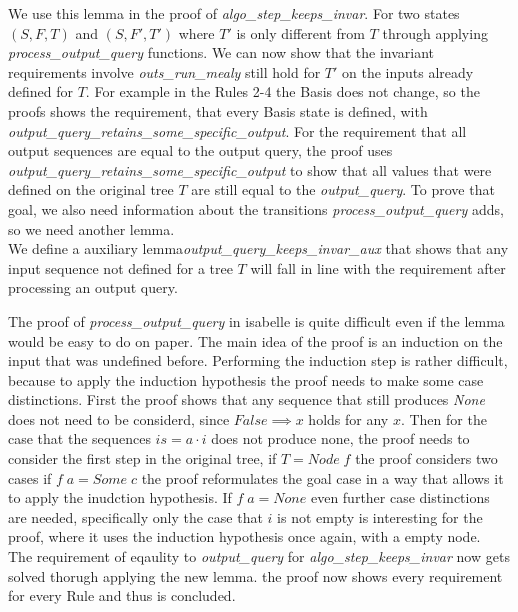  We use this lemma in the proof of \textit{algo\_step\_keeps\_invar}. For two states $(S,F,T)$ and $(S,F',T')$ where $T'$ is only different from $T$ through applying \textit{process\_output\_query} functions. We can now show that the invariant requirements involve \textit{outs\_run\_mealy} still hold for $T'$ on the inputs already defined for $T$. For example in the Rules 2-4 the Basis does not change, so the proofs shows the requirement, that every Basis state is defined, with \textit{output\_query\_retains\_some\_specific\_output}. For the requirement that all output sequences are equal to the output query, the proof uses \textit{output\_query\_retains\_some\_specific\_output} to show that all values that were defined on the original tree $T$ are still equal to the \textit{output\_query}. To prove that goal, we also need information about the transitions \textit{process\_output\_query} adds, so we need another lemma.\\
We define a auxiliary lemma\textit{output\_query\_keeps\_invar\_aux} that shows that any input sequence not defined for a tree $T$ will fall in line with the requirement after processing an output query.
\begin{myisabelle}
	\oqueryinvaraux
\end{myisabelle} 
The proof of \textit{process\_output\_query} in isabelle is quite difficult even if the lemma would be easy to do on paper. The main idea of the proof is an induction on the input that was undefined before. Performing the induction step is rather difficult, because to apply the induction hypothesis the proof needs to make some case distinctions. First the proof shows that any sequence that still produces \textit{None} does not need to be considerd, since $False \implies x$ holds for any $x$. Then for the case that the sequences $is=a\cdot i$ does not produce none, the proof needs to consider the first step in the original tree, if $T=Node\; f$ the proof considers two cases if $f\; a = Some\; c$ the proof reformulates the goal case in a way that allows it to apply the inudction hypothesis. If $f\; a=None$ even further case distinctions are needed, specifically only the case that $i$ is not empty is interesting for the proof, where it uses the induction hypothesis once again, with a empty node.\\
The requirement of eqaulity to \textit{output\_query} for \textit{algo\_step\_keeps\_invar} now gets solved thorugh applying the new lemma. the proof now shows every requirement for every Rule and thus is concluded. 
